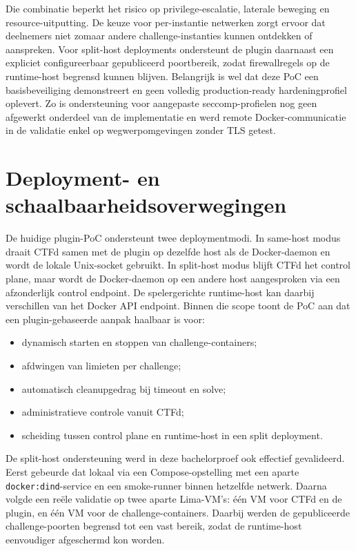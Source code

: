 Die combinatie beperkt het risico op privilege-escalatie, laterale beweging en resource-uitputting. De keuze voor per-instantie netwerken zorgt ervoor dat deelnemers niet zomaar andere challenge-instanties kunnen ontdekken of aanspreken. Voor split-host deployments ondersteunt de plugin daarnaast een expliciet configureerbaar gepubliceerd poortbereik, zodat firewallregels op de runtime-host begrensd kunnen blijven. Belangrijk is wel dat deze PoC een basisbeveiliging demonstreert en geen volledig production-ready hardeningprofiel oplevert. Zo is ondersteuning voor aangepaste seccomp-profielen nog geen afgewerkt onderdeel van de implementatie en werd remote Docker-communicatie in de validatie enkel op wegwerpomgevingen zonder TLS getest.

\clearpage

\section{Deployment- en schaalbaarheidsoverwegingen}%
\label{sec:poc-schaalbaarheid}

De huidige plugin-PoC ondersteunt twee deploymentmodi. In same-host modus draait CTFd samen met de plugin op dezelfde host als de Docker-daemon en wordt de lokale Unix-socket gebruikt. In split-host modus blijft CTFd het control plane, maar wordt de Docker-daemon op een andere host aangesproken via een afzonderlijk control endpoint. De spelergerichte runtime-host kan daarbij verschillen van het Docker API endpoint. Binnen die scope toont de PoC aan dat een plugin-gebaseerde aanpak haalbaar is voor:

\begin{itemize}
  \item dynamisch starten en stoppen van challenge-containers;
  \item afdwingen van limieten per challenge;
  \item automatisch cleanupgedrag bij timeout en solve;
  \item administratieve controle vanuit CTFd;
  \item scheiding tussen control plane en runtime-host in een split deployment.
\end{itemize}

De split-host ondersteuning werd in deze bachelorproef ook effectief gevalideerd. Eerst gebeurde dat lokaal via een Compose-opstelling met een aparte \texttt{docker:dind}-service en een smoke-runner binnen hetzelfde netwerk. Daarna volgde een reële validatie op twee aparte Lima-VM's: één VM voor CTFd en de plugin, en één VM voor de challenge-containers. Daarbij werden de gepubliceerde challenge-poorten begrensd tot een vast bereik, zodat de runtime-host eenvoudiger afgeschermd kon worden.

